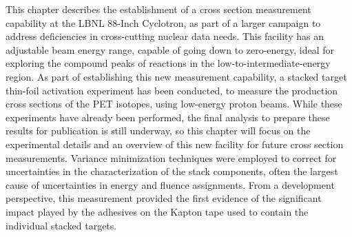 This chapter describes the establishment of a cross section measurement capability at   
the LBNL 88-Inch Cyclotron, as part of a larger campaign to address deficiencies in cross-cutting nuclear data needs.  
This facility has an adjustable beam energy range, capable of going down to zero-energy, ideal for exploring the compound peaks of reactions in the low-to-intermediate-energy region.
As part of establishing this new measurement capability, a  stacked target thin-foil activation experiment  has been conducted, to measure  the production cross sections of the  PET isotopes, using low-energy proton beams.
While these experiments have already been performed, the final analysis to prepare these results for publication is still underway, so this chapter will focus on the experimental details and an overview of this new facility for future cross section measurements.
Variance minimization techniques were employed  to correct for uncertainties in  the characterization of the stack components, often the largest cause of uncertainties in energy and  fluence assignments.
From a development perspective, this measurement provided the first evidence of the significant impact  played by the adhesives on the Kapton tape used to contain the individual stacked targets. 
